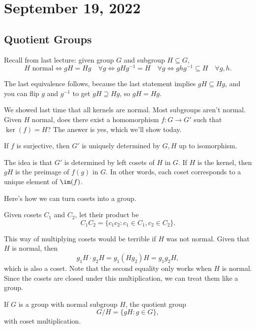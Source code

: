 \section{September 19, 2022}

\subsection{Quotient Groups}

Recall from last lecture: given group $G$ and subgroup $H\subseteq G$, 
\[H\text{ normal}\iff gH=Hg\quad \forall g\iff gHg^{-1}=H \quad \forall g\iff ghg^{-1}\subseteq H \quad \forall g,h.\]

The last equivalence follows, because the last statement implies $gH\subseteq Hg$, and you can flip $g$ and $g^{-1}$ to get $gH\supseteq Hg$, so $gH=Hg$. 

We showed last time that all kernels are normal. Most subgroups aren't normal. Given $H$ normal, does there exist a homomorphism $f: G\rightarrow G'$ such that $\ker(f) = H$? The answer is yes, which we'll show today. 

\begin{theorem}
\claimlabel 

If $f$ is surjective, then $G'$ is uniquely determined by $G,H$ up to isomorphism. 
\end{theorem}

The idea is that $G'$ is determined by left cosets of $H$ in $G$. If $H$ is the kernel, then $gH$ is the preimage of $f(g)$ in $G$. In other words, each coset corresponds to a unique element of $\im (f)$. 

Here's how we can turn cosets into a group.
\begin{definition}

Given cosets $C_1$ and $C_2$, let their product be 
\[C_1C_2 = \{c_1c_2 : c_1\in C_1, c_2\in C_2\}.\]
\end{definition}

This way of multiplying cosets would be terrible if $H$ was not normal. Given that $H$ is normal, then
\[g_1H\cdot g_2H = g_1(Hg_2)H = g_1g_2 H,\]
which is also a coset. Note that the second equality only works when $H$ is normal. Since the cosets are closed under this multiplication, we can treat them like a group. 

\begin{definition}

If $G$ is a group with normal subgroup $H$, the \ac{quotient group}
\[G/H = \{gH : g\in G\},\]
with coset multiplication. 
\end{definition}

